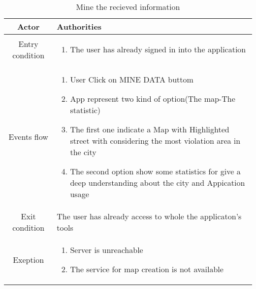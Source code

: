 \documentclass{article}
\begin{document}
		\begin{table} [H]
		\begin{center}
		\caption{Mine the recieved information}
		\begin{tabular}{|c|p{8cm}|}
			\hline
			Actor&Authorities\\
			\hline
			Entry condition& \begin{enumerate}
								\item The user has already signed in into the application
							\end{enumerate}\\
			\hline
			 Events flow& \begin{enumerate}
							\item User Click on MINE DATA buttom 			
							\item App represent two kind of option(The map-The statistic)
							\item The first one indicate a Map with Highlighted street with considering the most violation area in the city
							\item The second option show some statistics for give a deep understanding about the city and Appication usage
						\end{enumerate}\\
			\hline
			Exit condition& The user has already access to whole the applicaton's tools\\
			\hline
			Exeption& \begin{enumerate}
						\item Server is unreachable
						\item The service for map creation is not available
					\end{enumerate}\\
			\hline
		\end{tabular}
		\end{center}
		\end{table} 
\end{document}
